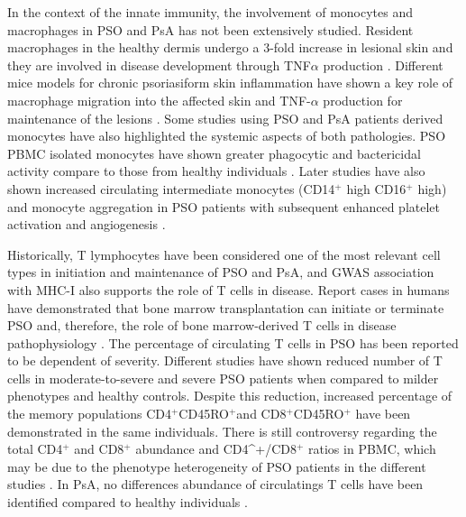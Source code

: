 In the context of the innate immunity, the involvement of monocytes and macrophages in PSO and PsA has not been extensively studied. Resident macrophages in the healthy dermis undergo a 3-fold increase in lesional skin and they are involved in disease development through TNF$\alpha$ production \parencite{Perera2012, Mahil2016}. Different mice models for chronic psoriasiform skin inflammation have shown a key role of macrophage migration into the affected skin and TNF-$\alpha$ production for maintenance of the lesions \parencite{Stratis2006, Wang2006}. Some studies using PSO and PsA patients derived monocytes have also highlighted the systemic aspects of both pathologies. PSO PBMC isolated monocytes have shown greater phagocytic and bactericidal activity compare to those from healthy individuals \parencite{Bar-Eli1979}. Later studies have also shown increased circulating intermediate monocytes (CD14$^+$ high CD16$^+$ high) and monocyte aggregation in PSO patients with subsequent enhanced platelet activation and angiogenesis \parencite {Golden2015}. %

Historically, T lymphocytes have been considered one of the most relevant cell types in initiation and maintenance of PSO and PsA, and GWAS association with MHC-I also supports the role of T cells in disease. Report cases in humans have demonstrated that bone marrow transplantation can initiate or terminate PSO and, therefore, the role of bone marrow-derived T cells in disease pathophysiology \parencite{Eedy1990, Gardembas1990}. The percentage of circulating T cells in PSO has been reported to be dependent of severity. Different studies have shown reduced number of T cells in moderate-to-severe and severe PSO patients when compared to milder phenotypes and healthy controls. Despite this reduction, increased percentage of the memory populations CD4$^+$CD45RO$^+$and CD8$^+$CD45RO$^+$ have been demonstrated in the same individuals\parencite{Lecewicz-Toruń2001,Langewouters2008}. There is still controversy regarding the total CD4$^+$ and CD8$^+$ abundance and CD4^+/CD8$^+$ ratios in PBMC, which may be due to the phenotype heterogeneity of PSO patients in the different studies \parencite{Lecewicz-Toruń2001,Cameron2003,Langewouters2008}. In PsA, no differences  abundance of circulatings T cells have been identified compared to healthy individuals \parencite{Costello1999}.

